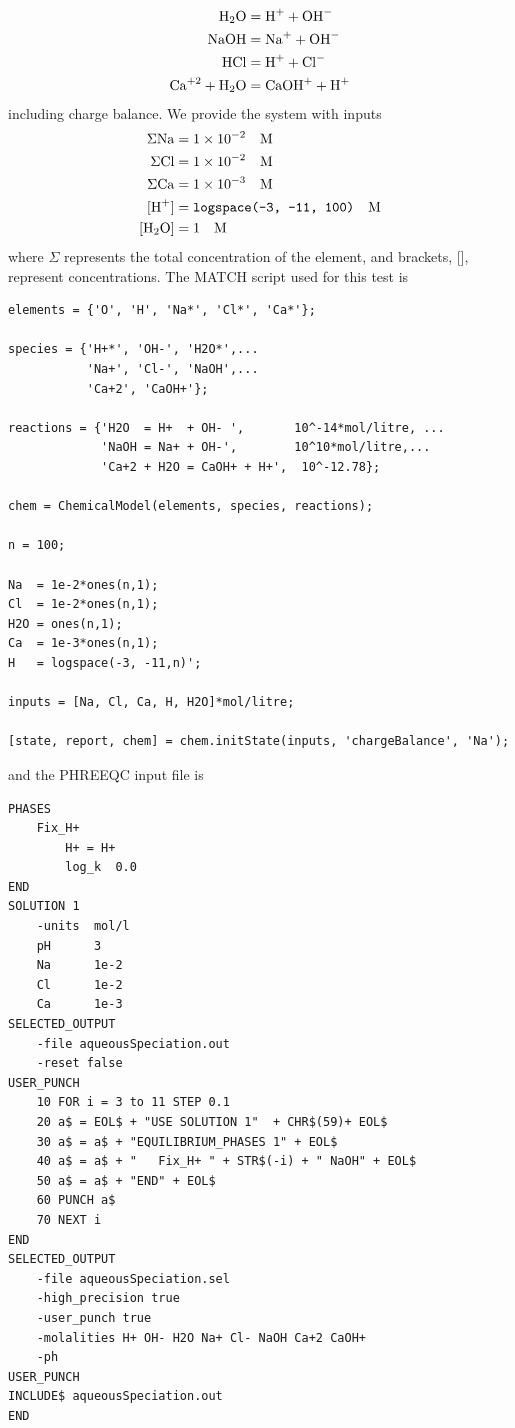 \documentclass{article}
\begin{document}
\begin{align}
    \ce{H2O} &= \ce{H+} + \ce{OH-}\\
    \ce{NaOH}&= \ce{Na+} + \ce{OH-}\\
    \ce{HCl} &= \ce{H+} + \ce{Cl-}\\
    \ce{Ca^{+2}} + \ce{H2O} &=\ce{CaOH+} + \ce{H+}
\end{align}
including charge balance. We provide the system with inputs
\begin{align}
\Sigma \ce{Na} &= 1\times10^{-2} \quad\text{M}\\
\Sigma \ce{Cl} &= 1\times10^{-2} \quad\text{M}\\
\Sigma \ce{Ca} &= 1\times10^{-3} \quad\text{M}\\
[\ce{H+}] &= \texttt{logspace(-3, -11, 100)} \quad\text{M}\\
[\ce{H2O}] & = 1 \quad\text{M}
\end{align}
where $\Sigma$ represents the total concentration of the element, and brackets, [], represent concentrations. The MATCH script used for this test is
\begin{lstlisting}
elements = {'O', 'H', 'Na*', 'Cl*', 'Ca*'};

species = {'H+*', 'OH-', 'H2O*',...
           'Na+', 'Cl-', 'NaOH',...
           'Ca+2', 'CaOH+'};

reactions = {'H2O  = H+  + OH- ',       10^-14*mol/litre, ...
             'NaOH = Na+ + OH-',        10^10*mol/litre,...
             'Ca+2 + H2O = CaOH+ + H+',  10^-12.78};

chem = ChemicalModel(elements, species, reactions);

n = 100;

Na  = 1e-2*ones(n,1);
Cl  = 1e-2*ones(n,1);
H2O = ones(n,1);
Ca  = 1e-3*ones(n,1);
H   = logspace(-3, -11,n)';

inputs = [Na, Cl, Ca, H, H2O]*mol/litre;

[state, report, chem] = chem.initState(inputs, 'chargeBalance', 'Na');
\end{lstlisting}
and the PHREEQC input file is

\begin{Verbatim}[frame=single,fontsize=\footnotesize]
PHASES
	Fix_H+
		H+ = H+
		log_k  0.0
END
SOLUTION 1
	-units	mol/l
	pH		3
	Na 		1e-2
	Cl 		1e-2
	Ca 		1e-3 
SELECTED_OUTPUT
    -file aqueousSpeciation.out
    -reset false
USER_PUNCH
	10 FOR i = 3 to 11 STEP 0.1
	20 a$ = EOL$ + "USE SOLUTION 1"  + CHR$(59)+ EOL$
	30 a$ = a$ + "EQUILIBRIUM_PHASES 1" + EOL$
	40 a$ = a$ + "   Fix_H+ " + STR$(-i) + " NaOH" + EOL$
	50 a$ = a$ + "END" + EOL$
	60 PUNCH a$
	70 NEXT i
END
SELECTED_OUTPUT
	-file aqueousSpeciation.sel
	-high_precision true
	-user_punch true
	-molalities H+ OH- H2O Na+ Cl- NaOH Ca+2 CaOH+
	-ph
USER_PUNCH
INCLUDE$ aqueousSpeciation.out
END
\end{Verbatim}
\end{document}

